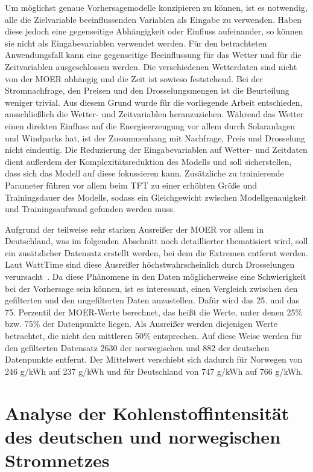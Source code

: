 Um möglichst genaue Vorhersagemodelle konzipieren zu können, ist es notwendig, alle die Zielvariable beeinflussenden Variablen als Eingabe zu verwenden.
Haben diese jedoch eine gegenseitige Abhängigkeit oder Einfluss aufeinander, so können sie nicht als Eingabevariablen verwendet werden.
Für den betrachteten Anwendungsfall kann eine gegenseitige Beeinflussung für das Wetter und für die Zeitvariablen ausgeschlossen werden.
Die verschiedenen Wetterdaten sind nicht von der \ac{MOER} abhängig und die Zeit ist sowieso feststehend.
Bei der Stromnachfrage, den Preisen und den Drosselungsmengen ist die Beurteilung weniger trivial.
Aus diesem Grund wurde für die vorliegende Arbeit entschieden, ausschließlich die Wetter- und Zeitvariablen heranzuziehen.
Während das Wetter einen direkten Einfluss auf die Energieerzeugung vor allem durch Solaranlagen und Windparks hat, ist der Zusammenhang mit Nachfrage, Preis und Drosselung nicht eindeutig.
Die Reduzierung der Eingabevariablen auf Wetter- und Zeitdaten dient außerdem der Komplexitätsreduktion des Modells und soll sicherstellen, dass sich das Modell auf diese fokussieren kann.
Zusätzliche zu trainierende Parameter führen vor allem beim \ac{TFT} zu einer erhöhten Größe und Trainingsdauer des Modells, sodass ein Gleichgewicht zwischen Modellgenauigkeit und Trainingsaufwand gefunden werden muss.

\noindent Aufgrund der teilweise sehr starken Ausreißer der \ac{MOER} vor allem in Deutschland, was im folgenden Abschnitt noch detaillierter thematisiert wird, soll ein zusätzlicher Datensatz erstellt werden, bei dem die Extremen entfernt werden.
Laut WattTime sind diese Ausreißer höchstwahrscheinlich durch Drosselungen verursacht~\cite{WattTime.2022}.
Da diese Phänomene in den Daten möglicherweise eine Schwierigkeit bei der Vorhersage sein können, ist es interessant, einen Vergleich zwischen den gefilterten und den ungefilterten Daten anzustellen.
Dafür wird das 25. und das 75. Perzentil der \ac{MOER}-Werte berechnet, das heißt die Werte, unter denen 25\% bzw. 75\% der Datenpunkte liegen.
Als Ausreißer werden diejenigen Werte betrachtet, die nicht den mittleren 50\% entsprechen.
Auf diese Weise werden für den gefilterten Datensatz 2630 der norwegischen und 882 der deutschen Datenpunkte entfernt.
Der Mittelwert verschiebt sich dadurch für Norwegen von 246 g/\ac{kWh} auf 237 g/\ac{kWh} und für Deutschland von 747 g/\ac{kWh} auf 766 g/\ac{kWh}.

\section{Analyse der Kohlenstoffintensität des deutschen und norwegischen Stromnetzes}\label{CAP:ci-analysis}

